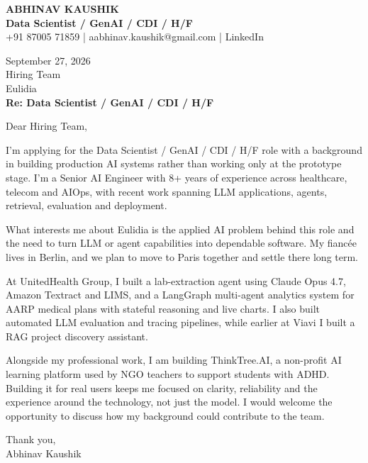 \documentclass[10pt,a4paper]{article}
\begin{document}
\begin{center}
{\Large\bfseries ABHINAV KAUSHIK}\\[2pt]
{\bfseries Data Scientist / GenAI / CDI / H/F}\\[2pt]
+91 87005 71859 \quad | \quad aabhinav.kaushik@gmail.com \quad | \quad LinkedIn
\end{center}
\vspace{8pt}
September 27, 2026\\[6pt]
Hiring Team\\
Eulidia\\[4pt]
\textbf{Re: Data Scientist / GenAI / CDI / H/F}

Dear Hiring Team,

I’m applying for the Data Scientist / GenAI / CDI / H/F role with a background in building production AI systems rather than working only at the prototype stage. I’m a Senior AI Engineer with 8+ years of experience across healthcare, telecom and AIOps, with recent work spanning LLM applications, agents, retrieval, evaluation and deployment.

What interests me about Eulidia is the applied AI problem behind this role and the need to turn LLM or agent capabilities into dependable software. My fiancée lives in Berlin, and we plan to move to Paris together and settle there long term.

At UnitedHealth Group, I built a lab-extraction agent using Claude Opus 4.7, Amazon Textract and LIMS, and a LangGraph multi-agent analytics system for AARP medical plans with stateful reasoning and live charts. I also built automated LLM evaluation and tracing pipelines, while earlier at Viavi I built a RAG project discovery assistant.

Alongside my professional work, I am building ThinkTree.AI, a non-profit AI learning platform used by NGO teachers to support students with ADHD. Building it for real users keeps me focused on clarity, reliability and the experience around the technology, not just the model. I would welcome the opportunity to discuss how my background could contribute to the team.

Thank you,\\
Abhinav Kaushik
\end{document}
